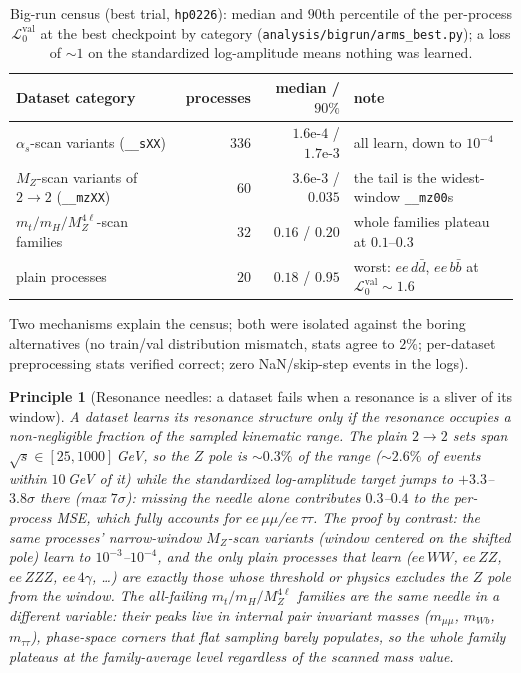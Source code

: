 \documentclass[11pt]{article}
\newcommand{\vlnr}{\mathcal{L}^{\mathrm{val}}_{0}}   %
\newcommand{\code}[1]{\texttt{#1}}
\newtheorem{principle}{Principle}
\begin{document}
\begin{table}[H]
\centering
\caption{Big-run census (best trial, \code{hp0226}): median and $90$th percentile of the
per-process $\vlnr$ at the best checkpoint by category (\code{analysis/bigrun/arms\_best.py}); a
loss of $\sim\!1$ on the standardized log-amplitude means nothing was learned.}
\label{tab:bigrun_census}
\begin{tabular}{@{}lrrl@{}}
\toprule
Dataset category & processes & median / $90\%$ & note \\
\midrule
$\alpha_s$-scan variants (\code{\_\_sXX}) & $336$ & $1.6\text{e-}4$ / $1.7\text{e-}3$ & all learn, down to $10^{-4}$ \\
$M_Z$-scan variants of $2\!\to\!2$ (\code{\_\_mzXX}) & $60$ & $3.6\text{e-}3$ / $0.035$ & the tail is the widest-window \code{\_\_mz00}s \\
$m_t/m_H/M_Z^{4\ell}$-scan families & $32$ & $0.16$ / $0.20$ & whole families plateau at $0.1$--$0.3$ \\
plain processes & $20$ & $0.18$ / $0.95$ & worst: $ee\,d\bar d$, $ee\,b\bar b$ at $\vlnr\!\sim\!1.6$ \\
\bottomrule
\end{tabular}
\end{table}

Two mechanisms explain the census; both were isolated against the boring alternatives (no
train/val distribution mismatch, stats agree to $2\%$; per-dataset preprocessing stats verified
correct; zero NaN/skip-step events in the logs).

\begin{principle}[Resonance needles: a dataset fails when a resonance is a sliver of its window]\label{prin:needle}
A dataset learns its resonance structure only if the resonance occupies a non-negligible fraction
of the sampled kinematic range. The plain $2\!\to\!2$ sets span $\sqrt s\in[25,1000]$\,GeV, so the
$Z$ pole is $\sim\!0.3\%$ of the range ($\sim\!2.6\%$ of events within $10$\,GeV of it) while the
standardized log-amplitude target jumps to $+3.3$--$3.8\sigma$ there (max $7\sigma$): missing the
needle alone contributes $0.3$--$0.4$ to the per-process MSE, which fully accounts for
$ee\,\mu\mu$/$ee\,\tau\tau$. The proof by contrast: the \emph{same} processes' narrow-window
$M_Z$-scan variants (window centered on the shifted pole) learn to $10^{-3}$--$10^{-4}$, and the
only plain processes that learn ($ee\,WW$, $ee\,ZZ$, $ee\,ZZZ$, $ee\,4\gamma$, \dots) are exactly
those whose threshold or physics excludes the $Z$ pole from the window. The all-failing
$m_t/m_H/M_Z^{4\ell}$ families are the same needle in a different variable: their peaks live in
\emph{internal} pair invariant masses ($m_{\mu\mu}$, $m_{Wb}$, $m_{\tau\tau}$), phase-space
corners that flat sampling barely populates, so the whole family plateaus at the
family-average level regardless of the scanned mass value.
\end{principle}
\end{document}
